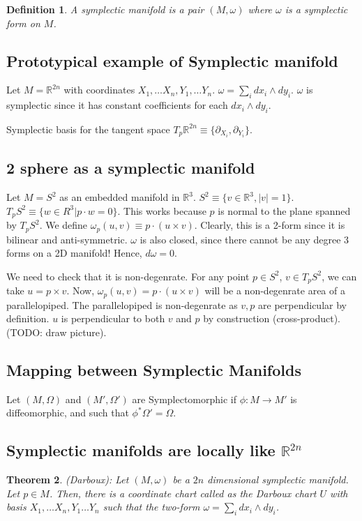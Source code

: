 \documentclass[11pt]{book}
\newcommand{\R}{\ensuremath{\mathbb R}}
\newtheorem{theorem}{Theorem}
\newtheorem{definition}[theorem]{Definition}
\begin{document}
\begin{definition}
    A symplectic manifold is a pair $(M, \omega)$ where $\omega$ is a symplectic
    form on $M$.
\end{definition}

\subsection{Prototypical example of Symplectic manifold}
Let $M = \R^{2n}$ with coordinates $X_1, \dots X_n, Y_1, \dots Y_n$.
$\omega = \sum_i dx_i  \wedge dy_i$.  $\omega$ is symplectic since it
has constant coefficients for each $dx_i \wedge dy_i$.

Symplectic basis for the tangent space 
$T_p \R^{2n} \equiv \{ \partial_{X_i}, \partial_{Y_i} \}$.

\subsection{2 sphere as a symplectic manifold}
Let $M = S^2$ as an embedded manifold in $\R^3$.
$S^2 \equiv \{ v \in \R^3, |v| = 1 \}$.
$T_p S^2 \equiv \{ w \in R^3 | p \cdot w = 0 \}$.
This works because $p$ is normal to the plane spanned by $T_p S^2$.
We define $\omega_p(u, v) \equiv p \cdot (u \times v)$. Clearly, this is
a 2-form since it is bilinear and anti-symmetric. $\omega$ is also closed,
since there cannot be any degree 3 forms on a 2D manifold! Hence, $d\omega = 0$.

We need to check that it is non-degenrate. For any point $p \in S^2$, 
$v \in T_p S^2$, we can take $u = p \times v$. Now, $\omega_p(u, v) = p \cdot(u \times v)$ will be
a non-degenrate area of a parallelopiped. The parallelopiped is non-degenrate 
as $v, p$ are perpendicular by definition. $u$ is perpendicular to both $v$
and $p$ by construction (cross-product). (TODO: draw picture).

\subsection{Mapping between Symplectic Manifolds}
Let $(M, \Omega)$ and $(M', \Omega')$ are Symplectomorphic if $\phi: M \rightarrow M'$
is diffeomorphic, and such that $\phi^* \Omega' = \Omega$.


\subsection{Symplectic manifolds are locally like $\R^{2n}$}
\begin{theorem} (Darboux): Let $(M, \omega)$ be a $2n$ dimensional symplectic
    manifold. Let $p \in M$. Then, there is a coordinate chart called 
    as the Darboux chart $U$ with basis $X_1, \dots X_n, Y_1 \dots Y_n$ such that
    the two-form $\omega = \sum_i dx_i \wedge dy_i$.
\end{theorem}
\end{document}
